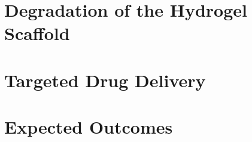 \documentclass[
    letterpaper,
    10pt,
    unnumberedsections,
    twoside
]{LTJournalArticle}
\begin{document}

    

    \section{Degradation of the Hydrogel Scaffold}

    

    \section{Targeted Drug Delivery}

    


    

    \section{Expected Outcomes}

    

    \onecolumn
    \printbibliography
\end{document}
